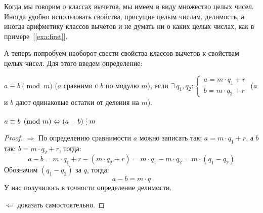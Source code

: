 \documentclass[russian]{lecture-notes}
\newcommand{\divs}{\mathrel{\raisebox{-2pt}{\vdots}}}
\begin{document}
\begin{note}
	Когда мы говорим о классах вычетов, мы имеем в виду множество целых чисел. Иногда удобно использовать свойства, присущие целым числам, делимость, а иногда арифметику классов вычетов и не думать ни о каких целых числах, как в примере~[\ref{exa:first}]. 
\end{note}

А теперь попробуем наоборот свести свойства классов вычетов к свойствам целых чисел. Для этого введем определение:
\begin{definition}
	$a \equiv b \pmod m$ ($a$ сравнимо с $b$ по модулю $m$), если $\exists \ q_1,q_2 : 
	\begin{cases}
		a = m \cdot q_1 + r \\
		b = m \cdot q_2 + r
	\end{cases}$
	($a$ и $b$ дают одинаковые остатки от деления на $m$). 
\end{definition}

\begin{theorem}
	$a \equiv b \pmod m \Leftrightarrow (a-b) \divs{m}$
\end{theorem}

\begin{proof}
	$\Rightarrow$ По определению сравнимости $a$ можно записать так: $a = m \cdot q_1 + r$, а $b$ так: $b = m \cdot q_2 + r$, тогда:
	\[
		a - b = m \cdot q_1 + r - (m \cdot q_2 + r) = m \cdot q_1 - m \cdot q_2 = m \cdot (q_1 - q_2) 
	\]
	Обозначим $(q_1 - q_2)$ за $q$, тогда:
	\[
		a - b = m \cdot q
	\]
	У нас получилось в точности определение делимости.
	
	\noindent$\Leftarrow$ доказать самостоятельно.
	
\end{proof}
\end{document}
